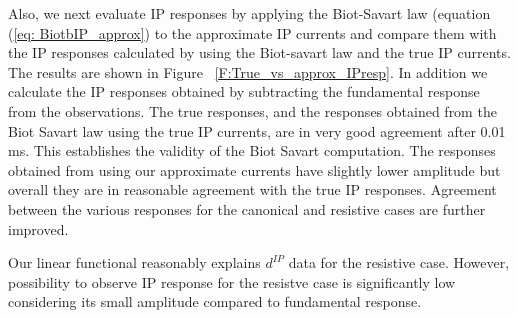 \documentclass[extra,mreferee]{gji}
\newcommand{\dip}{d^{IP}}
\begin{document}
Also, we next evaluate IP responses by applying the Biot-Savart law (equation (\ref{eq: BiotbIP_approx}) to the approximate IP currents and compare them with the IP responses calculated by using the Biot-savart law and the true IP currents. The results are shown in Figure ~\ref{F:True_vs_approx_IPresp}. In addition we calculate the IP responses obtained by subtracting the fundamental response from the observations. The true responses, and the responses obtained from the Biot Savart law using the true IP currents, are in very good agreement after 0.01 ms. This establishes the validity of the Biot Savart computation. The responses obtained from using our approximate currents have slightly lower amplitude but overall they are in reasonable agreement with the true IP responses. Agreement between the various responses for the canonical and resistive cases are further improved.


Our linear functional reasonably explains $\dip$ data for the resistive case. However, possibility to observe IP response for the resistve case is significantly low considering its small amplitude compared to fundamental response. 
\end{document}
